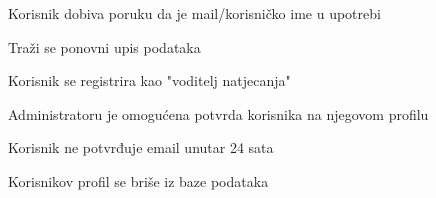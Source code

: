 \begin{packed_item}
\begin{packed_item}
\begin{packed_enum}
								\item Korisnik dobiva poruku da je mail/korisničko ime u upotrebi
								\item Traži se ponovni upis podataka
								
							\end{packed_enum}
							\item[2.f]Korisnik se registrira kao "voditelj natjecanja"
							\item[] \begin{packed_enum}
								
								\item Administratoru je omogućena potvrda korisnika na njegovom profilu
							\end{packed_enum}
							\item[5.a] Korisnik ne potvrđuje email unutar 24 sata
							\item[] \begin{packed_enum}
								
								\item Korisnikov profil se briše iz baze podataka 
								
							\end{packed_enum}						
							
						\end{packed_item}
					\end{packed_item}
					
